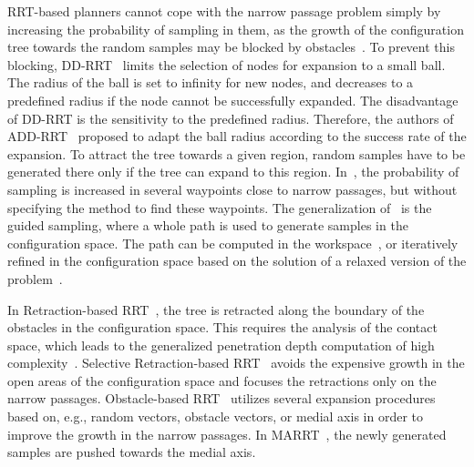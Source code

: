 \documentclass[usletter, 10pt, conference]{ieeeconf} %
\def\qrand{q_{rand}}
\def\qnear{q_{near}}
\begin{document}
RRT-based planners cannot cope with the narrow passage problem simply by increasing the probability of sampling in them, as the
growth of the configuration tree towards the random samples may be blocked by obstacles~\cite{vonasekphd}.
To prevent this blocking, DD-RRT~\cite{yershovaDDRRT} limits the selection of nodes for expansion to a small ball. 
The radius of the ball is set to infinity for new nodes, and decreases to a predefined radius if the node cannot be successfully expanded.
The disadvantage of DD-RRT is the sensitivity to the predefined radius.
Therefore, the authors of ADD-RRT~\cite{jailletADRRT} proposed to adapt the ball radius according to the success rate of the expansion.
To attract the tree towards a given region, random samples have to be generated there only if the tree can expand to this region.
In~\cite{kardossRRTKK}, the probability of sampling is increased in several waypoints close to narrow passages, but without specifying
the method to find these waypoints.
The generalization of~\cite{kardossRRTKK} is the guided sampling, where a whole path is used
to generate samples in the configuration space.
The path can be computed in the workspace~\cite{vonasek2009rrt}, or iteratively refined in the configuration space based on the solution of a relaxed version of the problem~\cite{bayazitIRC}.


In Retraction-based RRT~\cite{zhangRetraction}, the tree is retracted along the boundary of the obstacles in the configuration space.
This requires the analysis of the contact space, which leads to the generalized penetration depth computation of high complexity~\cite{he2016efficient}. %
Selective Retraction-based RRT~\cite{lee2012srrrt} avoids the expensive growth in the open areas of the configuration space and focuses 
the retractions only on the narrow passages.
Obstacle-based RRT~\cite{amatoOBRRT} utilizes several expansion procedures based on, e.g., random vectors, obstacle vectors, or medial axis in order to improve the growth in the narrow passages.
In MARRT~\cite{denny2014marrt}, the newly generated samples are pushed towards the medial axis.
\end{document}
